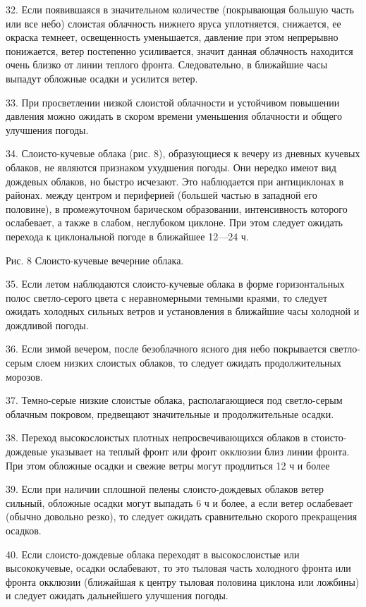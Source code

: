 32. Если появившаяся в значительном количестве (покрывающая большую часть или все небо) слоистая облачность нижнего яруса уплотняется, снижается, ее окраска темнеет, освещенность уменьшается, давление при этом непрерывно понижается, ветер постепенно усиливается, значит данная облачность находится очень близко от линии теплого фронта. Следовательно, в ближайшие часы выпадут обложные осадки и усилится ветер.

33. При просветлении низкой слоистой облачности и устойчивом повышении давления можно ожидать в скором времени уменьшения облачности и общего улучшения погоды.

34. Слоисто-кучевые облака (рис. 8), образующиеся к вечеру из дневных кучевых облаков, не являются признаком ухудшения погоды. Они нередко имеют вид дождевых облаков, но быстро исчезают. Это наблюдается при антициклонах в районах. между центром и периферией (большей частью в западной его половине), в промежуточном барическом образовании, интенсивность которого ослабевает, а также в слабом, неглубоком циклоне. При этом следует ожидать перехода к циклональной погоде в ближайшее 12—24 ч.


Рис. 8 Слоисто-кучевые вечерние облака.

35. Если летом наблюдаются слоисто-кучевые облака в форме горизонтальных полос светло-серого цвета с неравномерными темными краями, то следует ожидать холодных сильных ветров и установления в ближайшие часы холодной и дождливой погоды.

36. Если зимой вечером, после безоблачного ясного дня небо покрывается светло-серым слоем низких слоистых облаков, то следует ожидать продолжительных морозов.

37. Темно-серые низкие слоистые облака, располагающиеся под светло-серым облачным покровом, предвещают значительные и продолжительные осадки.

38. Переход высокослоистых плотных непросвечивающихся облаков в стоисто-дождевые указывает на теплый фронт или фронт окклюзии близ линии фронта. При этом обложные осадки и свежие ветры могут продлиться 12 ч и более

39. Если при наличии сплошной пелены слоисто-дождевых облаков ветер сильный, обложные осадки могут выпадать 6 ч и более, а если ветер ослабевает (обычно довольно резко), то следует ожидать сравнительно скорого прекращения осадков.

40. Если слоисто-дождевые облака переходят в высокослоистые или высококучевые, осадки ослабевают, то это тыловая часть холодного фронта или фронта окклюзии (ближайшая к центру тыловая половина циклона или ложбины) и следует ожидать дальнейшего улучшения погоды.

